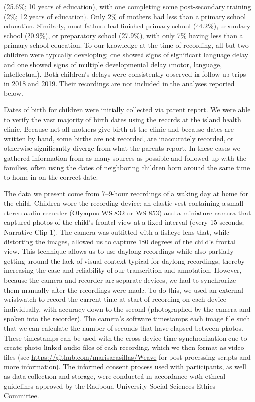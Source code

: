 \documentclass[,man,floatsintext]{apa6}
\begin{document}
(25.6\%; 10 years of education), with one completing some post-secondary
training (2\%; 12 years of education). Only 2\% of mothers had less than
a primary school education. Similarly, most fathers had finished primary
school (44.2\%), secondary school (20.9\%), or preparatory school
(27.9\%), with only 7\% having less than a primary school education. To
our knowledge at the time of recording, all but two children were
typically developing; one showed signs of significant language delay and
one showed signs of multiple developmental delay (motor, language,
intellectual). Both children's delays were consistently observed in
follow-up trips in 2018 and 2019. Their recordings are not included in
the analyses reported below.

Dates of birth for children were initially collected via parent report.
We were able to verify the vast majority of birth dates using the
records at the island health clinic. Because not all mothers give birth
at the clinic and because dates are written by hand, some births are not
recorded, are inaccurately recorded, or otherwise significantly diverge
from what the parents report. In these cases we gathered information
from as many sources as possible and followed up with the families,
often using the dates of neighboring children born around the same time
to home in on the correct date.

The data we present come from 7--9-hour recordings of a waking day at
home for the child. Children wore the recording device: an elastic vest
containing a small stereo audio recorder (Olympus WS-832 or WS-853) and
a miniature camera that captured photos of the child's frontal view at a
fixed interval (every 15 seconds; Narrative Clip 1). The camera was
outfitted with a fisheye lens that, while distorting the images, allowed
us to capture 180 degrees of the child's frontal view. This technique
allows us to use daylong recordings while also partially getting around
the lack of visual context typical for daylong recordings, thereby
increasing the ease and reliability of our transcrition and annotation.
However, because the camera and recorder are separate devices, we had to
synchronize them manually after the recordings were made. To do this, we
used an external wristwatch to record the current time at start of
recording on each device individually, with accuracy down to the second
(photographed by the camera and spoken into the recorder). The camera's
software timestamps each image file such that we can calculate the
number of seconds that have elapsed between photos. These timestamps can
be used with the cross-device time synchronization cue to create
photo-linked audio files of each recording, which we then format as
video files (see \url{https://github.com/marisacasillas/Weave} for
post-processing scripts and more information). The informed consent
process used with participants, as well as data collection and storage,
were conducted in accordance with ethical guidelines approved by the
Radboud University Social Sciences Ethics Committee.
\end{document}
